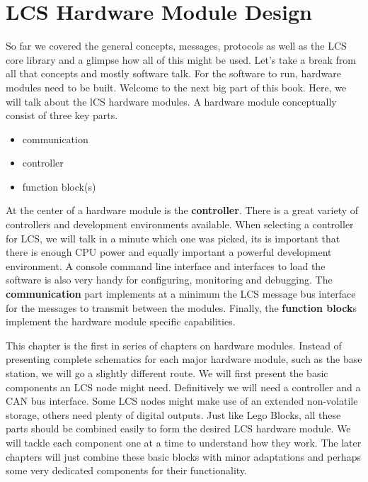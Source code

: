\chapter{LCS Hardware Module Design}

So far we covered the general concepts, messages, protocols as well as the LCS core library and a glimpse how all of this might be used. Let's take a break from all that concepts and mostly software talk. For the software to run, hardware modules need to be built. Welcome to the next big part of this book. Here, we will talk about the lCS hardware modules. A hardware module conceptually consist of three key parts.

\begin{itemize}
\item communication
\item controller
\item function block(s)
\end{itemize}

At the center of a hardware module is the \textbf{controller}. There is a great variety of controllers and development environments available. When selecting a controller for LCS, we will talk in a minute which one was picked, its is important that there is enough CPU power and equally important a powerful development environment. A console command line interface and interfaces to load the software is also very handy for configuring, monitoring and debugging. The \textbf{communication} part implements at a minimum the LCS message bus interface for the messages to transmit between the modules. Finally, the \textbf{function block}s implement the hardware module specific capabilities.

 This chapter is the first in series of chapters on hardware modules. Instead of presenting complete schematics for each major hardware module, such as the base station, we will go a slightly different route. We will first present the basic components an LCS node might need. Definitively we will need a controller and a CAN bus interface. Some LCS nodes might make use of an extended non-volatile storage, others need plenty of digital outputs. Just like Lego Blocks, all these parts should be combined easily to form the desired LCS hardware module. We will tackle each component one at a time to understand how they work. The later chapters will just combine these basic blocks with minor adaptations and perhaps some very dedicated components for their functionality.

